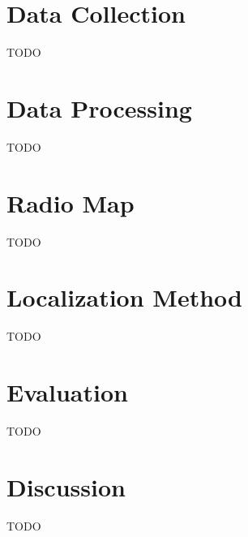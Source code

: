 
\section{Data Collection}
\label{sec:data-collections}

TODO

\section{Data Processing}
\label{sec:data-processing}

TODO

\section{Radio Map}
\label{sec:radio-map}

TODO

\section{Localization Method}
\label{sec:localization-method}

TODO

\section{Evaluation}
\label{sec:evaluation}

TODO

\section{Discussion}
\label{sec:disccusion}

TODO
